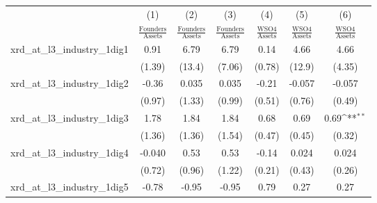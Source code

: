 {
\def\sym#1{\ifmmode^{#1}\else\(^{#1}\)\fi}
\begin{tabular}{l*{6}{c}}
\toprule
                    &\multicolumn{1}{c}{(1)}&\multicolumn{1}{c}{(2)}&\multicolumn{1}{c}{(3)}&\multicolumn{1}{c}{(4)}&\multicolumn{1}{c}{(5)}&\multicolumn{1}{c}{(6)}\\
                    &\multicolumn{1}{c}{$\frac{\textrm{Founders}}{\textrm{Assets}}$}&\multicolumn{1}{c}{$\frac{\textrm{Founders}}{\textrm{Assets}}$}&\multicolumn{1}{c}{$\frac{\textrm{Founders}}{\textrm{Assets}}$}&\multicolumn{1}{c}{$\frac{\textrm{WSO4}}{\textrm{Assets}}$}&\multicolumn{1}{c}{$\frac{\textrm{WSO4}}{\textrm{Assets}}$}&\multicolumn{1}{c}{$\frac{\textrm{WSO4}}{\textrm{Assets}}$}\\
\midrule
xrd\_at\_l3\_industry\_1dig1&        0.91         &        6.79         &        6.79         &        0.14         &        4.66         &        4.66         \\
                    &      (1.39)         &      (13.4)         &      (7.06)         &      (0.78)         &      (12.9)         &      (4.35)         \\
\addlinespace
xrd\_at\_l3\_industry\_1dig2&       -0.36         &       0.035         &       0.035         &       -0.21         &      -0.057         &      -0.057         \\
                    &      (0.97)         &      (1.33)         &      (0.99)         &      (0.51)         &      (0.76)         &      (0.49)         \\
\addlinespace
xrd\_at\_l3\_industry\_1dig3&        1.78         &        1.84         &        1.84         &        0.68         &        0.69         &        0.69\sym{**} \\
                    &      (1.36)         &      (1.36)         &      (1.54)         &      (0.47)         &      (0.45)         &      (0.32)         \\
\addlinespace
xrd\_at\_l3\_industry\_1dig4&      -0.040         &        0.53         &        0.53         &       -0.14         &       0.024         &       0.024         \\
                    &      (0.72)         &      (0.96)         &      (1.22)         &      (0.21)         &      (0.43)         &      (0.26)         \\
\addlinespace
xrd\_at\_l3\_industry\_1dig5&       -0.78         &       -0.95         &       -0.95         &        0.79         &        0.27         &        0.27         \\

\end{tabular}}
